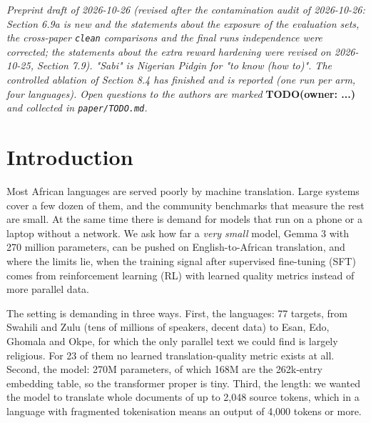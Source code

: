 \emph{Preprint draft of 2026-10-26 (revised after the contamination audit of 2026-10-26: Section 6.9a is new and the statements about the exposure of the evaluation sets, the cross-paper \texttt{clean} comparisons and the final run\textquotesingle s independence were corrected; the statements about the extra reward hardening were revised on 2026-10-25, Section 7.9). "Sabi" is Nigerian Pidgin for "to know (how to)". The controlled ablation of Section 8.4 has finished and is reported (one run per arm, four languages). Open questions to the authors are marked} {\color{red}\textbf{TODO(owner: ...)}} \emph{and collected in \texttt{paper/TODO.md}.}



\section{Introduction}\label{introduction}

Most African languages are served poorly by machine translation. Large systems cover a few dozen of them, and the community benchmarks that measure the rest are small. At the same time there is demand for models that run on a phone or a laptop without a network. We ask how far a \emph{very small} model, Gemma 3 with 270 million parameters, can be pushed on English-to-African translation, and where the limits lie, when the training signal after supervised fine-tuning (SFT) comes from reinforcement learning (RL) with learned quality metrics instead of more parallel data.

The setting is demanding in three ways. First, the languages: 77 targets, from Swahili and Zulu (tens of millions of speakers, decent data) to Esan, Edo, Ghomala and Okpe, for which the only parallel text we could find is largely religious. For 23 of them no learned translation-quality metric exists at all. Second, the model: 270M parameters, of which 168M are the 262k-entry embedding table, so the transformer proper is tiny. Third, the length: we wanted the model to translate whole documents of up to 2,048 source tokens, which in a language with fragmented tokenisation means an output of 4,000 tokens or more.

